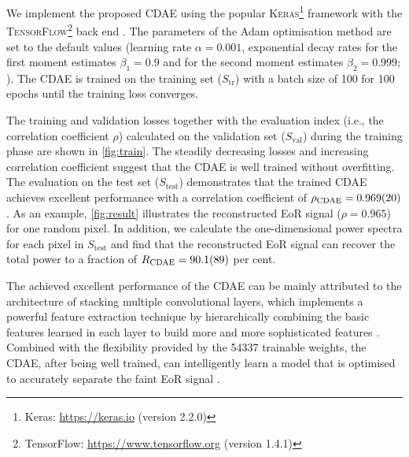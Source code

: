 \documentclass[fleqn,usenatbib]{mnras}
\newcommand{\R}[1]{\mathrm{#1}}
\begin{document}
We implement the proposed CDAE using the popular \textsc{Keras}\footnote{%
  Keras: \url{https://keras.io} (version 2.2.0)}
framework \citep{keras} with the \textsc{TensorFlow}\footnote{%
TensorFlow: \url{https://www.tensorflow.org} (version 1.4.1)}
back end \citep{tensorflow}.
The parameters of the Adam optimisation method are set to the default
values (learning rate $\alpha = 0.001$, exponential decay rates for the
first moment estimates $\beta_1 = 0.9$ and for the second moment
estimates $\beta_2 = 0.999$; \citealt{kingma2015}).
The CDAE is trained on the training set ($S_{\R{tr}}$) with a batch size
of 100 for 100 epochs until the training loss converges.

The training and validation losses together with the evaluation index
(i.e., the correlation coefficient $\rho$) calculated on the validation set
($S_{\R{val}}$) during the training phase are shown in \autoref{fig:train}.
The steadily decreasing losses and increasing correlation coefficient
suggest that the CDAE is well trained without overfitting.
The evaluation on the test set ($S_{\R{test}}$) demonstrates that the
trained CDAE achieves excellent performance with a correlation
coefficient of $\rho_{\R{CDAE}} = \num{0.969 +- 0.020}$.
As an example, \autoref{fig:result} illustrates the reconstructed EoR
signal ($\rho = 0.965$) for one random pixel.
In addition, we calculate the one-dimensional power spectra for each
pixel in $S_{\R{test}}$ \citep[e.g.,][]{chapman2013}
and find that the reconstructed EoR signal can recover the total power
to a fraction of $R_{\R{CDAE}} = \num{90.1 +- 8.9}$ per cent.

The achieved excellent performance of the CDAE can be mainly attributed
to the architecture of stacking multiple convolutional layers, which
implements a powerful feature extraction technique by hierarchically
combining the basic features learned in each layer to build more and
more sophisticated features \citep{lecun2015}.
Combined with the flexibility provided by the \num{54337} trainable
weights, the CDAE, after being well trained, can intelligently learn a
model that is optimised to accurately separate the faint EoR signal
\citep[e.g.,][]{domingos2012}.
\end{document}
